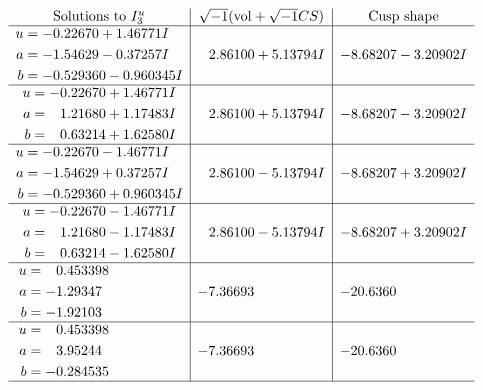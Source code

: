 \documentclass[1p]{elsarticle_modified}
\theoremstyle{definition}
\newcommand{\I}{\sqrt{-1}}
\begin{document}
$$\begin{array}{c|c|c}  
\text{Solutions to }I^u_{3}& \I (\text{vol} + \sqrt{-1}CS) & \text{Cusp shape}\\
 \hline 
\begin{aligned}
u &= -0.22670 + 1.46771 I \\
a &= -1.54629 - 0.37257 I \\
b &= -0.529360 - 0.960345 I\end{aligned}
 & \phantom{-}2.86100 + 5.13794 I & -8.68207 - 3.20902 I \\ \hline\begin{aligned}
u &= -0.22670 + 1.46771 I \\
a &= \phantom{-}1.21680 + 1.17483 I \\
b &= \phantom{-}0.63214 + 1.62580 I\end{aligned}
 & \phantom{-}2.86100 + 5.13794 I & -8.68207 - 3.20902 I \\ \hline\begin{aligned}
u &= -0.22670 - 1.46771 I \\
a &= -1.54629 + 0.37257 I \\
b &= -0.529360 + 0.960345 I\end{aligned}
 & \phantom{-}2.86100 - 5.13794 I & -8.68207 + 3.20902 I \\ \hline\begin{aligned}
u &= -0.22670 - 1.46771 I \\
a &= \phantom{-}1.21680 - 1.17483 I \\
b &= \phantom{-}0.63214 - 1.62580 I\end{aligned}
 & \phantom{-}2.86100 - 5.13794 I & -8.68207 + 3.20902 I \\ \hline\begin{aligned}
u &= \phantom{-}0.453398\phantom{ +0.000000I} \\
a &= -1.29347\phantom{ +0.000000I} \\
b &= -1.92103\phantom{ +0.000000I}\end{aligned}
 & -7.36693\phantom{ +0.000000I} & -20.6360\phantom{ +0.000000I} \\ \hline\begin{aligned}
u &= \phantom{-}0.453398\phantom{ +0.000000I} \\
a &= \phantom{-}3.95244\phantom{ +0.000000I} \\
b &= -0.284535\phantom{ +0.000000I}\end{aligned}
 & -7.36693\phantom{ +0.000000I} & -20.6360\phantom{ +0.000000I}\\
 \hline 
 \end{array}$$\newpage\newpage\renewcommand{\arraystretch}{1}
\end{document}
